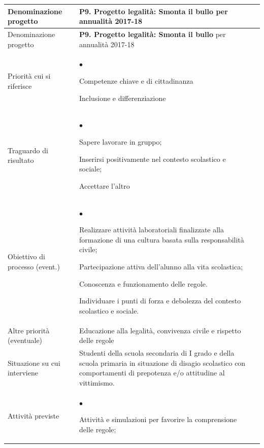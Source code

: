 \documentclass[12pt,a4paper,oneside]{memoir}
\newenvironment{elenco}{\begin{list}{$\bullet$}{%
              \setlength{\leftmargin}{4mm}%
              \setlength{\rightmargin}{1mm}%
               \setlength{\itemindent}{0mm}%
               \setlength{\labelwidth}{2mm}%
               \setlength{\labelsep}{2mm}%
              \setlength{\itemsep}{-\parsep}%
              \setlength{\partopsep}{0pt}%
              \setlength{\topsep}{0pt}%
             \setlength{\parskip}{0pt}%
              }}{\end{list}}
\begin{document}
\begin{footnotesize}
\begin{longtable}{|>{\raggedright}p{2.5cm}|>{\raggedright\arraybackslash}P{10cm}|}
\hline
{}
\label{P9}Denominazione progetto&\textbf{P9. Progetto legalità: Smonta il bullo} per annualità 2017-18\\ \hline \endfirsthead
\hline
{}
Denominazione progetto&\textbf{P9. Progetto legalità: Smonta il bullo} per annualità 2017-18\\ \hline \endhead
{}
\endfoot
\hline
\endlastfoot
Priorità cui si riferisce&\begin{elenco}
\item Competenze chiave e di cittadinanza
\item Inclusione e differenziazione
\end{elenco}\\[-4mm] \hline
Traguardo di risultato&
\begin{elenco}
\item Sapere lavorare in gruppo; 
\item Inserirsi positivamente nel contesto scolastico e sociale;
\item Accettare l'altro
\end{elenco}\\[-4mm] \hline
Obiettivo di processo (event.)&
\begin{elenco}
\item Realizzare attività laboratoriali finalizzate alla formazione di una cultura basata sulla responsabilità civile;
\item Partecipazione attiva dell'alunno alla vita scolastica;
\item Conoscenza e funzionamento delle regole. 
\item Individuare i punti di forza e debolezza del contesto scolastico e sociale.
\end{elenco}\\[-4mm] \hline
Altre priorità (eventuale)&Educazione alla legalità, convivenza civile e rispetto delle regole \\ \hline
Situazione su cui interviene&Studenti della scuola secondaria di I grado e della scuola primaria in situazione di disagio scolastico con comportamenti di prepotenza e/o attitudine al vittimismo.\\ \hline
Attività previste&
\begin{elenco}
\item Attività e simulazioni per favorire la comprensione delle regole; 

\end{elenco}
\end{longtable}
\end{footnotesize}
\end{document}
